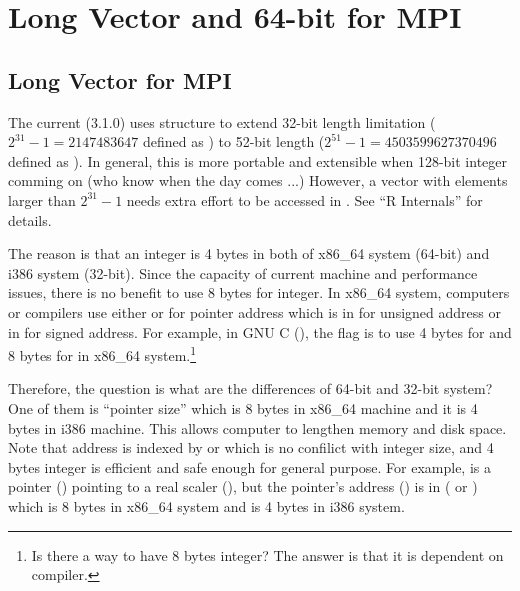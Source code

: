 
\section[Long Vector and 64-bit for MPI]{Long Vector and 64-bit for MPI}
\label{sec:long_vector}

\subsection{Long Vector for MPI}
The current  (3.1.0) uses  structure to extend
32-bit length limitation ($2^{31} - 1 = 2147483647$ defined as
) to 52-bit length ($2^{51} - 1 = 4503599627370496$
defined as ).
In general, this is more portable and extensible when 128-bit integer
comming on (who know when the day comes ...)
However, a vector with elements
larger than $2^{31} - 1$ needs extra effort to be accessed in
.
See ``R Internals'' for details.

The reason is that an integer is 4 bytes in both of
x86\_64 system (64-bit) and i386 system (32-bit).
Since the capacity of current machine and performance issues, there is no
benefit to use 8 bytes for integer.
In x86\_64 system, computers or compilers use either  or
 for pointer address which is in  for unsigned
address or in  for signed address.
For example, in GNU C (), the flag  is to
use 4 bytes for  and 8 bytes for 
in x86\_64 system.\footnote{
\color{red}
Is there a way to have 8 bytes integer?
The answer is that it is dependent on compiler.
}

Therefore, the question is what are the differences of 64-bit and
32-bit system? One of them is ``pointer size''
which is 8 bytes in x86\_64 machine and it is 4 bytes in i386 machine.
This allows computer to lengthen memory and disk space.
Note that address is indexed by  or  which is no
confilict with integer size, and 4 bytes integer is efficient and safe enough
for general purpose.
For example,  is a pointer () pointing to a real
scaler (), but the pointer's address () is in
 ( or )
which is 8 bytes in x86\_64 system and is 4 bytes in i386 system.


